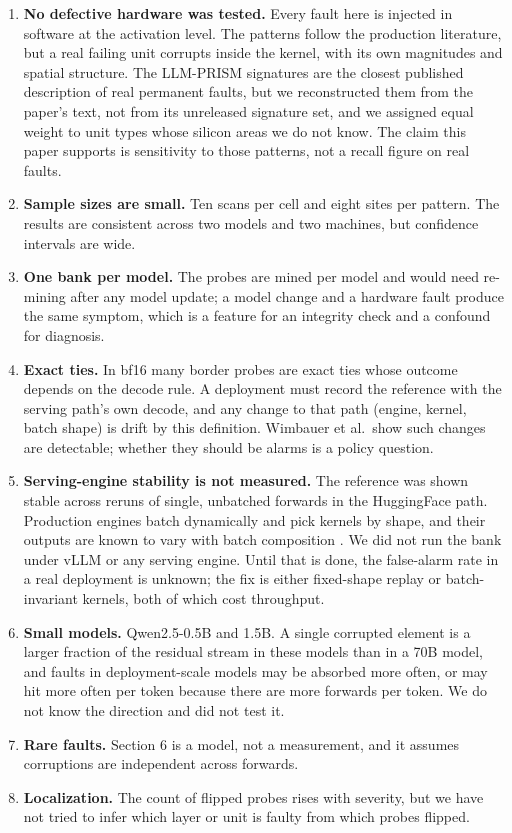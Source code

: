 \documentclass[11pt]{article}
\begin{document}
\begin{enumerate}\itemsep1pt
\item \textbf{No defective hardware was tested.} Every fault here is injected in software at the activation level. The patterns follow the production literature, but a real failing unit corrupts inside the kernel, with its own magnitudes and spatial structure. The LLM-PRISM signatures are the closest published description of real permanent faults, but we reconstructed them from the paper's text, not from its unreleased signature set, and we assigned equal weight to unit types whose silicon areas we do not know. The claim this paper supports is sensitivity to those patterns, not a recall figure on real faults.
\item \textbf{Sample sizes are small.} Ten scans per cell and eight sites per pattern. The results are consistent across two models and two machines, but confidence intervals are wide.
\item \textbf{One bank per model.} The probes are mined per model and would need re-mining after any model update; a model change and a hardware fault produce the same symptom, which is a feature for an integrity check and a confound for diagnosis.
\item \textbf{Exact ties.} In bf16 many border probes are exact ties whose outcome depends on the decode rule. A deployment must record the reference with the serving path's own decode, and any change to that path (engine, kernel, batch shape) is drift by this definition. Wimbauer et al.\ show such changes are detectable; whether they should be alarms is a policy question.
\item \textbf{Serving-engine stability is not measured.} The reference was shown stable across reruns of single, unbatched forwards in the HuggingFace path. Production engines batch dynamically and pick kernels by shape, and their outputs are known to vary with batch composition \citep{he2025nondeterminism}. We did not run the bank under vLLM or any serving engine. Until that is done, the false-alarm rate in a real deployment is unknown; the fix is either fixed-shape replay or batch-invariant kernels, both of which cost throughput.
\item \textbf{Small models.} Qwen2.5-0.5B and 1.5B. A single corrupted element is a larger fraction of the residual stream in these models than in a 70B model, and faults in deployment-scale models may be absorbed more often, or may hit more often per token because there are more forwards per token. We do not know the direction and did not test it.
\item \textbf{Rare faults.} Section 6 is a model, not a measurement, and it assumes corruptions are independent across forwards.
\item \textbf{Localization.} The count of flipped probes rises with severity, but we have not tried to infer which layer or unit is faulty from which probes flipped.
\end{enumerate}
\end{document}
